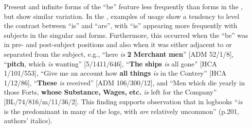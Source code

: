 Present  and infinite forms of the  “be” feature less frequently than  forms in the , but show similar variation. In the , examples of usage show a tendency to level the contrast between “is” and “are”, with “is” appearing more frequently with  subjects in the singular and   forms. Furthermore, this occurred when the “be” was in pre- and post-subject positions and also when it was either adjacent to or separated from the subject, e.g., “here \textit{is} \textbf{2} \textbf{Merchant} \textbf{men}” [ADM 52/1/8], “\textbf{pitch}, which \textit{is} wanting” [5/1411/646], “\textbf{The} \textbf{ships} \textit{is} all gone” [HCA 1/101/553], “Give me an account how \textbf{all} \textbf{things} \textit{is} in the Contrey” [HCA 1/12/86], “\textbf{These} \textit{is} received” [ADM 106/300/12], and “Men which die yearly in those Forts, \textbf{whose} \textbf{Substance,} \textbf{Wages,} \textbf{etc.} \textit{is} left for the Company” [BL/74/816/m/11/36/2]. This finding supports  observation that in  logbooks “\textit{is} is the predominant  in many of the logs, with \textit{are} relatively uncommon” (p.201, authors’ italics). 

